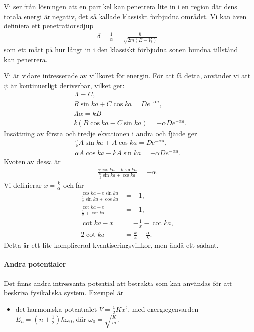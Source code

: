 Vi ser från lösningen att en partikel kan penetrera lite in i en region där dens totala energi är negativ, det så kallade klassiskt förbjudna området. Vi kan även definiera ett penetrationsdjup
\begin{align*}
	\delta = \frac{1}{\alpha} = \frac{\hbar}{\sqrt{2m(E - V_{0})}}
\end{align*}
som ett mått på hur långt in i den klassiskt förbjudna sonen bundna tillstånd kan penetrera.

Vi är vidare intresserade av villkoret för energin. För att få detta, använder vi att $\psi$ är kontinuerligt deriverbar, vilket ger:
\begin{align*}
	&A = C, \\
	&B\sin{ka} + C\cos{ka} = De^{-\alpha a}, \\
	&A\alpha = kB, \\
	&k(B\cos{ka} - C\sin{ka}) = -\alpha De^{-\alpha a}.
\end{align*}
Insättning av första och tredje ekvationen i andra och fjärde ger
\begin{align*}
	\frac{\alpha}{k}A\sin{ka} + A\cos{ka} = De^{-\alpha a}, \\
	\alpha A\cos{ka} - kA\sin{ka} = -\alpha De^{-\alpha a}.
\end{align*}
Kvoten av dessa är
\begin{align*}
	\frac{\alpha\cos{ka} - k\sin{ka}}{\frac{\alpha}{k}\sin{ka} + \cos{ka}} = -\alpha.
\end{align*}
Vi definierar $x = \frac{k}{\alpha}$ och får
\begin{align*}
	\frac{\cos{ka} - x\sin{ka}}{\frac{1}{x}\sin{ka} + \cos{ka}} &= -1, \\
	\frac{\cot{ka} - x}{\frac{1}{x} + \cot{ka}}                 &= -1, \\
	\cot{ka} - x                                                &= -\frac{1}{x} - \cot{ka}, \\
	2\cot{ka}                                                   &= \frac{k}{\alpha} - \frac{\alpha}{k}.
\end{align*}
Detta är ett lite komplicerad kvantiseringsvillkor, men ändå ett sådant.

\paragraph{Andra potentialer}
Det finns andra intressanta potential att betrakta som kan användas för att beskriva fysikaliska system. Exempel är
\begin{itemize}
	\item det harmoniska potentialet $V = \frac{1}{2}Kx^{2}$, med energiegenvärden $E_{n} = \left(n + \frac{1}{2}\right)\hbar\omega_{0}$, där $\omega_{0} = \sqrt{\frac{K}{m}}$.
\end{itemize}

